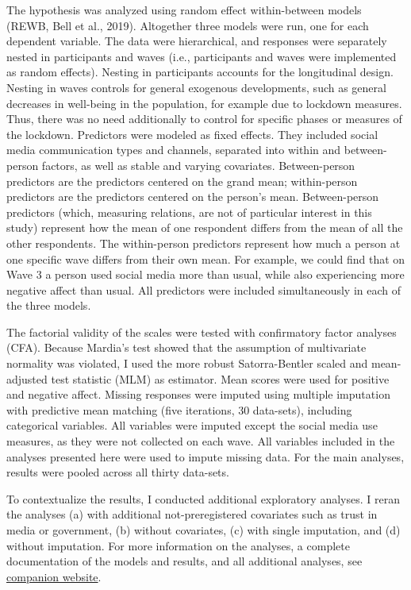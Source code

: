 \documentclass[
  man,mask,floatsintext]{apa7}
\begin{document}
The hypothesis was analyzed using random effect within-between models (REWB, Bell et al., 2019).
Altogether three models were run, one for each dependent variable.
The data were hierarchical, and responses were separately nested in participants and waves (i.e., participants and waves were implemented as random effects).
Nesting in participants accounts for the longitudinal design.
Nesting in waves controls for general exogenous developments, such as general decreases in well-being in the population, for example due to lockdown measures.
Thus, there was no need additionally to control for specific phases or measures of the lockdown.
Predictors were modeled as fixed effects.
They included social media communication types and channels, separated into within and between-person factors, as well as stable and varying covariates.
Between-person predictors are the predictors centered on the grand mean; within-person predictors are the predictors centered on the person's mean.
Between-person predictors (which, measuring relations, are not of particular interest in this study) represent how the mean of one respondent differs from the mean of all the other respondents.
The within-person predictors represent how much a person at one specific wave differs from their own mean.
For example, we could find that on Wave 3 a person used social media more than usual, while also experiencing more negative affect than usual.
All predictors were included simultaneously in each of the three models.

The factorial validity of the scales were tested with confirmatory factor analyses (CFA).
Because Mardia's test showed that the assumption of multivariate normality was violated, I used the more robust Satorra-Bentler scaled and mean-adjusted test statistic (MLM) as estimator.
Mean scores were used for positive and negative affect.
Missing responses were imputed using multiple imputation with predictive mean matching (five iterations, 30 data-sets), including categorical variables.
All variables were imputed except the social media use measures, as they were not collected on each wave.
All variables included in the analyses presented here were used to impute missing data.
For the main analyses, results were pooled across all thirty data-sets.

To contextualize the results, I conducted additional exploratory analyses.
I reran the analyses (a) with additional not-preregistered covariates such as trust in media or government, (b) without covariates, (c) with single imputation, and (d) without imputation.
For more information on the analyses, a complete documentation of the models and results, and all additional analyses, see \href{https://XMtRA.github.io/Austrian_Corona_Panel_Project}{companion website}.
\end{document}
